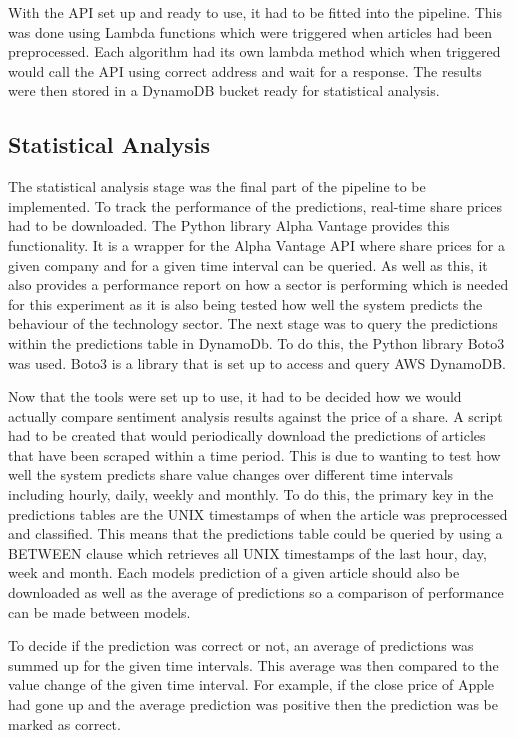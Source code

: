 \documentclass[a4paper,11pt]{report}
\begin{document}
With the API set up and ready to use, it had to be fitted into the pipeline. This was done using Lambda functions which were triggered when articles had been preprocessed. Each algorithm had its own lambda method which when triggered would call the API using correct address and wait for a response. The results were then stored in a DynamoDB bucket ready for statistical analysis.

\subsection{Statistical Analysis}
The statistical analysis stage was the final part of the pipeline to be implemented. To track the performance of the predictions, real-time share prices had to be downloaded.  The Python library Alpha Vantage provides this functionality. It is a wrapper for the Alpha Vantage API where share prices for a given company and for a given time interval can be queried. As well as this, it also provides a performance report on how a sector is performing which is needed for this experiment as it is also being tested how well the system predicts the behaviour of the technology sector. The next stage was to query the predictions within the predictions table in DynamoDb. To do this, the Python library Boto3 was used. Boto3 is a library that is set up to access and query AWS DynamoDB.

Now that the tools were set up to use, it had to be decided how we would actually compare sentiment analysis results against the price of a share. A script had to be created that would periodically download the predictions of articles that have been scraped within a time period. This is due to wanting to test how well the system predicts share value changes over different time intervals including hourly, daily, weekly and monthly. To do this, the primary key in the predictions tables are the UNIX timestamps of when the article was preprocessed and classified.  This means that the predictions table could be queried by using a BETWEEN clause which retrieves all UNIX timestamps of the last hour, day, week and month.  Each models prediction of a given article should also be downloaded as well as the average of predictions so a comparison of performance can be made between models.

To decide if the prediction was correct or not, an average of predictions was summed up for the given time intervals. This average was then compared to the value change of the given time interval.  For example, if the close price of Apple had gone up and the average prediction was positive then the prediction was be marked as correct.
\end{document}
